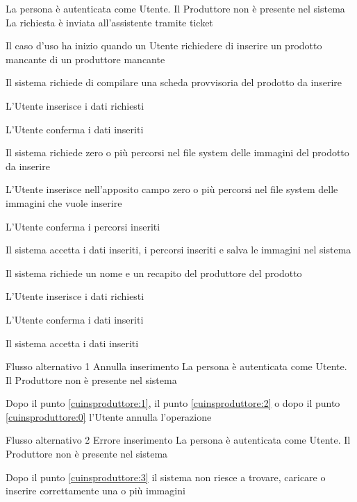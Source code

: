 \tabcuvspace

{}
{La persona è autenticata come Utente. Il Produttore non è presente nel sistema}
{La richiesta è inviata all'assistente tramite ticket}
{\begin{enumCU}
		\item Il caso d'uso ha inizio quando un Utente richiedere di inserire un prodotto mancante di un produttore mancante
		\item Il sistema richiede di compilare una scheda provvisoria del prodotto da inserire
		\item L'Utente inserisce i dati richiesti \label{cuinsproduttore:1}
		\item L'Utente conferma i dati inseriti 
		\item Il sistema richiede zero o più percorsi nel file system delle immagini del prodotto da inserire
		\item L'Utente inserisce nell'apposito campo zero o più percorsi nel file system delle immagini che vuole inserire \label{cuinsproduttore:2}
		\item L'Utente conferma i percorsi inseriti \label{cuinsproduttore:3}
		\item Il sistema accetta i dati inseriti, i percorsi inseriti e salva le immagini nel sistema
		\item Il sistema richiede un nome e un recapito del produttore del prodotto
		\item L'Utente inserisce i dati richiesti \label{cuinsproduttore:0}
		\item L'Utente conferma i dati inseriti
		\item Il sistema accetta i dati inseriti
	\end{enumCU}}
%
{Flusso alternativo 1}%
{Annulla inserimento}%
{La persona è autenticata come Utente. Il Produttore non è presente nel sistema}%
{\postNulle}%
{\begin{enumCU}
		\item Dopo il punto \ref{cuinsproduttore:1}, il punto \ref{cuinsproduttore:2} o dopo il punto \ref{cuinsproduttore:0} l'Utente annulla l'operazione
	\end{enumCU}}%
%
{Flusso alternativo 2}%
{Errore inserimento}%
{La persona è autenticata come Utente. Il Produttore non è presente nel sistema}%
{\postNulle}%
{\begin{enumCU}
		\item Dopo il punto \ref{cuinsproduttore:3} il sistema non riesce a trovare, caricare o inserire correttamente una o più immagini
	\end{enumCU}}%

